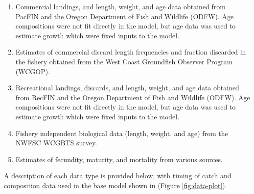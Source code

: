 \documentclass[11pt,
  english,
  a4paper,
]{article}
\begin{document}

\begin{enumerate}
\def\labelenumi{\arabic{enumi}.}
\item

  Commercial landings, and length, weight, and age data obtained from PacFIN and the Oregon Department of Fish and Wildlife (ODFW). Age compositions were not fit directly in the model, but age data was used to estimate growth which were fixed inputs to the model.

  \tagmcend\tagstructend\tagstructend
\item

  Estimates of commercial discard length frequencies and fraction discarded in the fishery obtained from the West Coast Groundfish Observer Program (WCGOP).

  \tagmcend\tagstructend\tagstructend
\item

  Recreational landings, discards, and length, weight, and age data obtained from RecFIN and the Oregon Department of Fish and Wildlife (ODFW). Age compositions were not fit directly in the model, but age data was used to estimate growth which were fixed inputs to the model.

  \tagmcend\tagstructend\tagstructend
\item

  Fishery independent biological data (length, weight, and age) from the NWFSC WCGBTS survey.

  \tagmcend\tagstructend\tagstructend
\item

  Estimates of fecundity, maturity, and mortality from various sources.

  \tagmcend\tagstructend\tagstructend
\end{enumerate}

\tagstructend


A description of each data type is provided below, with timing of catch and composition data used in the base model shown in (Figure \ref{fig:data-plot}).
\end{document}

